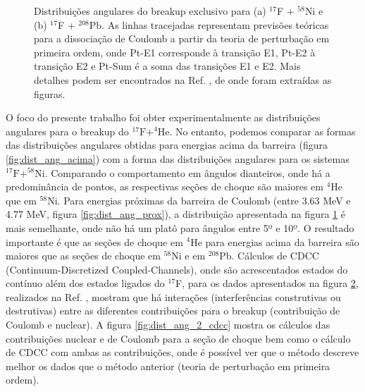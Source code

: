 \documentclass[a4paper,12pt,oneside]{book}
\begin{document}
\begin{figure}[H]
\begin{subfigure}[t]{0.45\textwidth}
        \caption{}
        \label{subfig:dist_ang_2_b}
    \end{subfigure}
\caption{Distribuições angulares do breakup exclusivo para (a) $^{17}$F + $^{58}$Ni e (b) $^{17}$F + $^{208}$Pb. As linhas tracejadas representam previsões teóricas para a dissociação de Coulomb a partir da teoria de perturbação em primeira ordem, onde Pt-E1 corresponde à transição E1, Pt-E2 à transição E2 e Pt-Sum é a soma das transições E1 e E2. Mais detalhes podem ser encontrados na Ref. \cite{LIANG200922}, de onde foram extraídas as figuras.}
\label{fig:dist_ang_2}
\end{figure}



\par O foco do presente trabalho foi obter experimentalmente as distribuições angulares para o breakup do $^{17}\mathrm{F}+^{4}\mathrm{He}$. No entanto, podemos comparar as formas das distribuições angulares obtidas para energias acima da barreira (figura \ref{fig:dist_ang_acima}) com a forma das distribuições angulares para os sistemas $^{17}\mathrm{F}+^{58}\mathrm{Ni}$. Comparando o comportamento em ângulos dianteiros, onde há a predominância de pontos, as respectivas seções de choque são maiores em $^4$He que em $^{58}$Ni. Para energias próximas da barreira de Coulomb (entre 3.63 MeV e 4.77 MeV, figura \ref{fig:dist_ang_prox}), a distribuição apresentada na figura \ref{subfig:dist_ang_2_b} é mais semelhante, onde não há um platô para ângulos entre 5º e 10º. O resultado importante é que as seções de choque em $^4$He para energias acima da barreira são maiores que as seções de choque em $^{58}$Ni e em $^{208}$Pb. Cálculos de CDCC (Continuum-Discretized Coupled-Channels), onde são acrescentados estados do contínuo além dos estados ligados do $^{17}$F, para os dados apresentados na figura \ref{fig:dist_ang_2}, realizados na Ref. \cite{MORO_BREAKUP}, mostram que há interações (interferências construtivas ou destrutivas) entre as diferentes contribuições para o breakup (contribuição de Coulomb e nuclear). A figura \ref{fig:dist_ang_2_cdcc} mostra os cálculos das contribuições nuclear e de Coulomb para a seção de choque bem como o cálculo de CDCC com ambas as contribuições, onde é possível ver que o método descreve melhor os dados que o método anterior (teoria de perturbação em primeira ordem).
\end{document}
